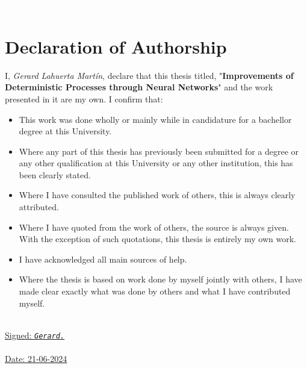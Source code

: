 \documentclass[a4paper, 11pt]{article}
\begin{document}
\justifying
\newpage
\textcolor{white}{a}
\newpage 

\section*{Declaration of Authorship}
I, \textit{Gerard Lahuerta Martín}, declare that this thesis titled, "\textbf{Improvements of Deterministic Processes through Neural Networks}" and the work presented in it are my own. I confirm that:
\begin{itemize}
    \item This work was done wholly or mainly while in candidature for a bachellor degree
    at this University.
    \item Where any part of this thesis has previously been submitted for a degree or
    any other qualification at this University or any other institution, this has been
    clearly stated.
    \item Where I have consulted the published work of others, this is always clearly
    attributed.
    \item Where I have quoted from the work of others, the source is always given. With
    the exception of such quotations, this thesis is entirely my own work.
    \item I have acknowledged all main sources of help.
    \item Where the thesis is based on work done by myself jointly with others, I have
    made clear exactly what was done by others and what I have contributed myself.
\end{itemize}
\textcolor{white}{a}\\
\underline{Signed: \hspace{7em} \textsl{\texttt{Gerard.}} \hspace{7em}}\\
\textcolor{white}{a}\\
\underline{Date: \hspace{7em} 21-06-2024 \hspace{7em}}


\newpage
\end{document}

